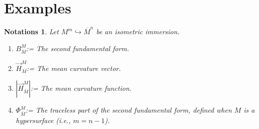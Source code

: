 \documentclass[11pt]{amsart}
\newtheorem{notations} {Notations}
\numberwithin{equation}{section}
\begin{document}
\section{\textbf{Examples}}
\begin{notations}\label{not1}
Let $M^m\hookrightarrow \overline{M}^n$ be an isometric immersion.
\begin{enumerate}
    \item $B^M_{\overline{M}}$:= The second fundamental form.
    
    \item $\vec{H}^M_{\overline{M}}$:= The mean curvature vector.

    \item
    $\left|\vec{H}^M_{\overline{M}}\right|$:= The mean curvature function.



     \item $\Phi^M_{\overline{M}}$:= The traceless part of the second fundamental form, defined when $M$ is a hypersurface (i.e., $m=n-1$).














\end{enumerate}
\end{notations}
\end{document}
